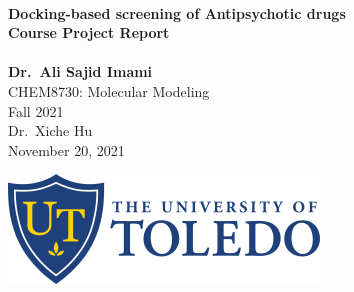 \thispagestyle{empty}
\begin{titlepage}


\vfill
\begin{center}

    \HRule \\[0.4cm]
    \textbf{\Huge{Docking-based screening of Antipsychotic drugs}}\\
    \textbf{\Large{Course Project Report}}\\
    \HRule \\[0.4cm]
    \bigskip
    \bigskip
    \Large
    \textbf{Dr.~Ali Sajid Imami}\\
    \bigskip
    CHEM8730: Molecular Modeling\\
    
    Fall 2021\\
    
    Dr.~Xiche Hu\\
    
    November 20, 2021\\
    \vfill
    
    \includegraphics{img/UT_logo.png}
\end{center}
\vfill
\end{titlepage}
